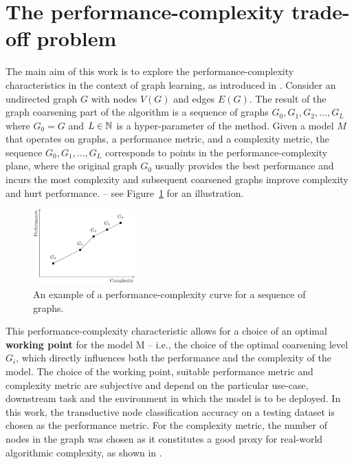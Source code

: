 \section{The performance-complexity trade-off problem}\label{sec:performance-complexity}

The main aim of this work is to explore the performance-complexity characteristics in the context of graph learning, as introduced in \cite{prochazka_downstream_2022}. Consider an undirected graph \( G \) with nodes \( V \left( G \right) \) and edges \( E \left( G \right) \). The result of the graph coarsening part of the algorithm is a sequence of graphs \( G_0, G_1, G_2, \dots, G_L \) where \( G_0 = G \) and \( L \in \mathbb{N} \) is a hyper-parameter of the method.
Given a model \( M \) that operates on graphs, a performance metric, and a complexity metric, the sequence \( G_0, G_1, \dots, G_L \) corresponds to points in the performance-complexity plane, where the original graph \( G_0 \) usually provides the best performance and incurs the most complexity and subsequent coarsened graphs improve complexity and hurt performance. -- see Figure~\ref{fig:performance-complexity} for an illustration.

\begin{figure}
  \centering
  \includegraphics[width=0.35\textwidth]{images/performance-complexity/performance-complexity.pdf}
  \caption{An example of a performance-complexity curve for a sequence of graphs.}
  \label{fig:performance-complexity}
\end{figure}

This performance-complexity characteristic allows for a choice of an optimal \textbf{working point} for the model M -- i.e., the choice of the optimal coarsening level \( G_i \), which directly influences both the performance and the complexity of the model. The choice of the working point, suitable performance metric and complexity metric are subjective and depend on the particular use-case, downstream task and the environment in which the model is to be deployed. In this work, the transductive node classification accuracy on a testing dataset is chosen as the performance metric. For the complexity metric, the number of nodes in the graph was chosen as it constitutes a good proxy for real-world algorithmic complexity, as shown in \cite{chiang_cluster-gcn_2019}.

